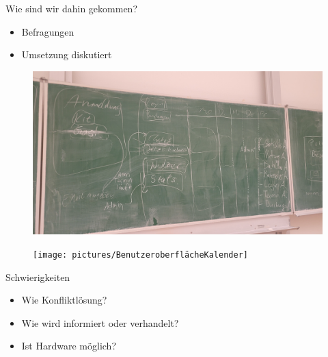 \begin{frame}{Wie sind wir dahin gekommen?}
    \begin{itemize}
        \item Befragungen
        \item Umsetzung diskutiert
    \end{itemize}
\end{frame}

\begin{frame}[plain]
    \thispagestyle{plain}
    \begin{figure}
        \centering
        \includegraphics[width=1\linewidth]{pictures/BrainstormTafelbild}
        \label{fig: Tafelbild Brainstorm}
    \end{figure}
\end{frame}

\begin{frame}[plain]
    \thispagestyle{plain}
    \begin{figure}
        \centering
        \texttt{[image: pictures/BenutzeroberflächeKalender]}
        \label{fig: Mockup Übersicht}
    \end{figure}
\end{frame}

\begin{frame}{Schwierigkeiten}
    \begin{itemize}
        \item Wie Konfliktlösung?
        \item Wie wird informiert oder verhandelt?
        \item Ist Hardware möglich?
    \end{itemize}
\end{frame}
